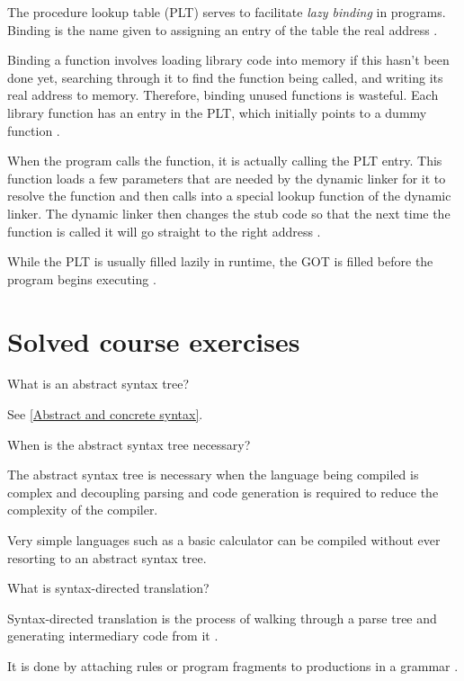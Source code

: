 The procedure lookup table (PLT) serves to facilitate \textit{lazy binding} in programs.
Binding is the name given to assigning an entry of the table the real address \cite{computer-science-from-the-bottom-up}.

Binding a function involves loading library code into memory if this hasn't been done yet, searching through it to find the function being called, and writing its real address to memory.
Therefore, binding unused functions is wasteful.
Each library function has an entry in the PLT, which initially points to a dummy function \cite{computer-science-from-the-bottom-up}.

When the program calls the function, it is actually calling the PLT entry.
This function loads a few parameters that are needed by the dynamic linker for it to resolve the function and then calls into a special lookup function of the dynamic linker.
The dynamic linker then changes the stub code so that the next time the function is called it will go straight to the right address \cite{computer-science-from-the-bottom-up}.

While the PLT is usually filled lazily in runtime, the GOT is filled before the program begins executing \cite{computer-science-from-the-bottom-up}.

\section{Solved course exercises}

\begin{Exercise}[difficulty=1]
What is an abstract syntax tree?
\end{Exercise}
\begin{Answer}
See \ref{Abstract and concrete syntax}.
\end{Answer}

\begin{Exercise}
When is the abstract syntax tree necessary?
\end{Exercise}
\begin{Answer}
The abstract syntax tree is necessary when the language being compiled is complex and decoupling parsing and code generation is required to reduce the complexity of the compiler.

Very simple languages such as a basic calculator can be compiled without ever resorting to an abstract syntax tree.
\end{Answer}

\begin{Exercise}
What is syntax-directed translation?
\end{Exercise}
\begin{Answer}
Syntax-directed translation is the process of walking through a parse tree and generating intermediary code from it \cite[p.~12]{compilers-aho-2007}.

It is done by attaching rules or program fragments to productions in a grammar \cite[p.~52]{compilers-aho-2007}.
\end{Answer}


